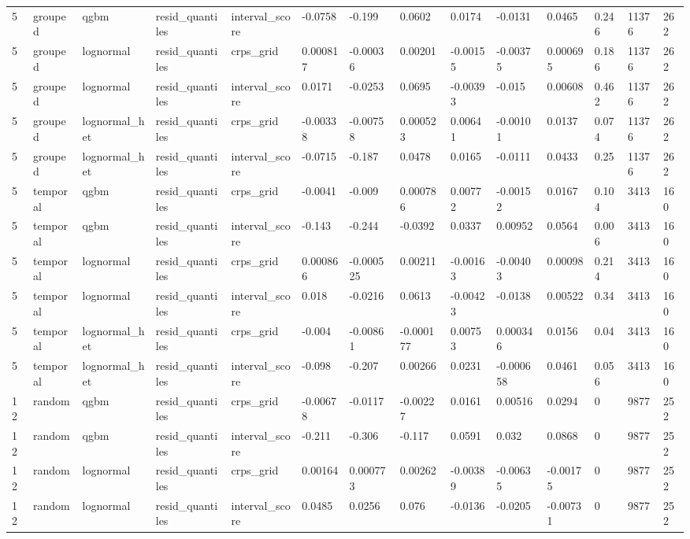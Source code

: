 \begin{tabular}{llllllllllllll}
5 & grouped & qgbm & resid\_quantiles & interval\_score & -0.0758 & -0.199 & 0.0602 & 0.0174 & -0.0131 & 0.0465 & 0.246 & 11376 & 262 \\
5 & grouped & lognormal & resid\_quantiles & crps\_grid & 0.000817 & -0.00036 & 0.00201 & -0.00155 & -0.00375 & 0.000695 & 0.186 & 11376 & 262 \\
5 & grouped & lognormal & resid\_quantiles & interval\_score & 0.0171 & -0.0253 & 0.0695 & -0.00393 & -0.015 & 0.00608 & 0.462 & 11376 & 262 \\
5 & grouped & lognormal\_het & resid\_quantiles & crps\_grid & -0.00338 & -0.00758 & 0.000523 & 0.00641 & -0.00101 & 0.0137 & 0.074 & 11376 & 262 \\
5 & grouped & lognormal\_het & resid\_quantiles & interval\_score & -0.0715 & -0.187 & 0.0478 & 0.0165 & -0.0111 & 0.0433 & 0.25 & 11376 & 262 \\
5 & temporal & qgbm & resid\_quantiles & crps\_grid & -0.0041 & -0.009 & 0.000786 & 0.00772 & -0.00152 & 0.0167 & 0.104 & 3413 & 160 \\
5 & temporal & qgbm & resid\_quantiles & interval\_score & -0.143 & -0.244 & -0.0392 & 0.0337 & 0.00952 & 0.0564 & 0.006 & 3413 & 160 \\
5 & temporal & lognormal & resid\_quantiles & crps\_grid & 0.000866 & -0.000525 & 0.00211 & -0.00163 & -0.00403 & 0.00098 & 0.214 & 3413 & 160 \\
5 & temporal & lognormal & resid\_quantiles & interval\_score & 0.018 & -0.0216 & 0.0613 & -0.00423 & -0.0138 & 0.00522 & 0.34 & 3413 & 160 \\
5 & temporal & lognormal\_het & resid\_quantiles & crps\_grid & -0.004 & -0.00861 & -0.000177 & 0.00753 & 0.000346 & 0.0156 & 0.04 & 3413 & 160 \\
5 & temporal & lognormal\_het & resid\_quantiles & interval\_score & -0.098 & -0.207 & 0.00266 & 0.0231 & -0.000658 & 0.0461 & 0.056 & 3413 & 160 \\
12 & random & qgbm & resid\_quantiles & crps\_grid & -0.00678 & -0.0117 & -0.00227 & 0.0161 & 0.00516 & 0.0294 & 0 & 9877 & 252 \\
12 & random & qgbm & resid\_quantiles & interval\_score & -0.211 & -0.306 & -0.117 & 0.0591 & 0.032 & 0.0868 & 0 & 9877 & 252 \\
12 & random & lognormal & resid\_quantiles & crps\_grid & 0.00164 & 0.000773 & 0.00262 & -0.00389 & -0.00635 & -0.00175 & 0 & 9877 & 252 \\
12 & random & lognormal & resid\_quantiles & interval\_score & 0.0485 & 0.0256 & 0.076 & -0.0136 & -0.0205 & -0.00731 & 0 & 9877 & 252 \\

\end{tabular}
